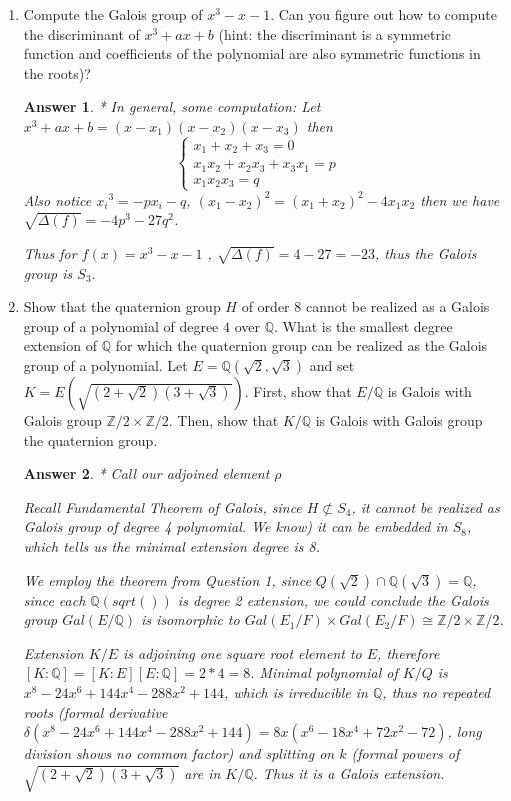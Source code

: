 \documentclass[11pt,leqno]{article}
\newcommand{\Q}{{\mathbb Q}}
\newcommand{\Z}{{\mathbb Z}}
\newcommand{\<}[1]{{\langle}#1 {\rangle}}
\theoremstyle{plain}
\newtheorem*{answer*}{Answer}
\theoremstyle{definition}
\theoremstyle{remark}
\numberwithin{equation}{section}
\begin{document}
\begin{enumerate}
    
\item Compute the Galois group of $x^3 - x - 1$.  Can you figure out how to compute the discriminant of $x^3 + ax + b$ (hint: the discriminant is a symmetric function and coefficients of the polynomial are also symmetric functions in the roots)?

\begin{answer*}*
In general, some computation: Let $x^3+ax+b=(x-x_1)(x-x_2)(x-x_3)$ then 
\[\begin{cases}
x_1+x_2+x_3=0 &\\
x_1x_2+x_2x_3+x_3x_1=p &\\
x_1x_2x_3=q 
\end{cases} \]  
Also notice ${x_i}^3=-px_i-q$, $(x_1-x_2)^2=(x_1+x_2)^2-4x_1x_2$
then we have $\sqrt{\Delta(f)}=-4p^3-27q^2$.

Thus for $f(x)=x^3 - x - 1$ , $\sqrt{\Delta(f)}=4-27=-23$, thus the Galois group is $S_3$.
\end{answer*}


\item Show that the quaternion group $H$ of order $8$ cannot be realized as a Galois group of a polynomial of degree $4$ over $\Q$.  What is the smallest degree extension of $\Q$ for which the quaternion group can be realized as the Galois group of a polynomial.  Let $E = \Q(\sqrt{2},\sqrt{3})$ and set $K = E(\sqrt{(2 + \sqrt{2})(3 + \sqrt{3})})$.  First, show that $E/\Q$ is Galois with Galois group $\Z/2 \times \Z/2$.  Then, show that $\textit{K}/\Q$ is Galois with Galois group the quaternion group.

\begin{answer*}* Call our adjoined element $\rho$

Recall Fundamental Theorem of Galois, since $H\not \subset S_4$, it cannot be realized as Galois group of degree 4 polynomial. We know) it can be embedded in $S_8$, which tells us the minimal extension degree is 8. 

We employ the theorem from Question 1, since $Q(\sqrt{2})\cap \Q(\sqrt{3})=\Q$, since each $\Q(sqrt())$ is degree 2 extension, we could conclude the Galois group $Gal(E/\Q)$ is isomorphic to $Gal(E_1/F)\times Gal(E_2/F) \cong \Z/2\times\Z/2$. 

Extension $K/E$ is adjoining one square root element to $E$, therefore $[K:\Q]=[K:E][E:\Q]=2*4=8$. Minimal polynomial of $K/Q$ is $x^8-24x^6+144x^4-288x^2+144$, which is irreducible in $\Q$, thus no repeated roots (formal derivative $\delta(x^8-24x^6+144x^4-288x^2+144)=8x(x^6-18x^4+72x^2-72)$, long division shows no common factor) and splitting on $k$ (formal powers of $\sqrt{(2 + \sqrt{2})(3 + \sqrt{3})}$ are in $K/\Q$. Thus it is a Galois extension. \\


\end{answer*}
\end{enumerate}
\end{document}
